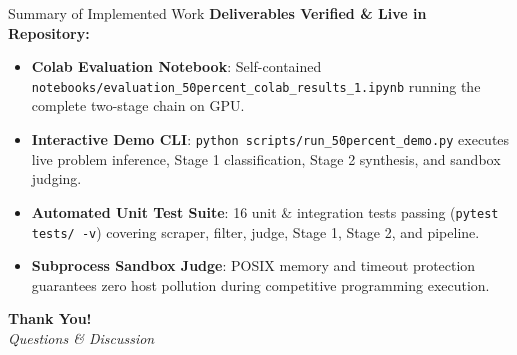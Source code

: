 \documentclass[aspectratio=169,10pt]{beamer}
\begin{document}
\begin{frame}{Summary of Implemented Work}
  \textbf{Deliverables Verified \& Live in Repository:}
  \vspace{4pt}
  \begin{itemize}\itemsep=4.5pt\footnotesize
    \item[$\checkmark$] \textbf{Colab Evaluation Notebook}: Self-contained \texttt{notebooks/evaluation\_50percent\_colab\_results\_1.ipynb} running the complete two-stage chain on GPU.
    \item[$\checkmark$] \textbf{Interactive Demo CLI}: \texttt{python scripts/run\_50percent\_demo.py} executes live problem inference, Stage 1 classification, Stage 2 synthesis, and sandbox judging.
    \item[$\checkmark$] \textbf{Automated Unit Test Suite}: 16 unit \& integration tests passing (\texttt{pytest tests/ -v}) covering scraper, filter, judge, Stage 1, Stage 2, and pipeline.
    \item[$\checkmark$] \textbf{Subprocess Sandbox Judge}: POSIX memory and timeout protection guarantees zero host pollution during competitive programming execution.
  \end{itemize}

  \vspace{10pt}
  \begin{center}
    \Huge \textbf{Thank You!} \\
    \vspace{4pt}
    \large \textit{Questions \& Discussion}
  \end{center}
\end{frame}
\end{document}
